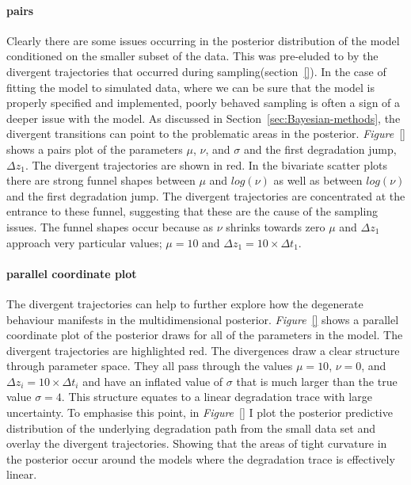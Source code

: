 \paragraph*{pairs}
Clearly there are some issues occurring in the posterior distribution of the model conditioned on the smaller subset of the data. This was pre-eluded to by the divergent trajectories that occurred during sampling(section~\ref{}). In the case of fitting the model to simulated data, where we can be sure that the model is properly specified and implemented, poorly behaved sampling is often a sign of a deeper issue with the model. As discussed in Section~\ref{sec:Bayesian-methods}, the divergent transitions can point to the problematic areas in the posterior. \textit{Figure}~\ref{} shows a pairs plot of the parameters $\mu$, $\nu$, and $\sigma$ and the first degradation jump, $\Delta z_1$. The divergent trajectories are shown in red. In the bivariate scatter plots there are strong funnel shapes between $\mu$ and $log(\nu)$ as well as between $log(\nu)$ and the first degradation jump. The divergent trajectories are concentrated at the entrance to these funnel, suggesting that these are the cause of the sampling issues. The funnel shapes occur because as $\nu$ shrinks towards zero $\mu$ and $\Delta z_1$ approach very particular values; $\mu = 10$ and $\Delta z_1 = 10 \times \Delta t_1$.

\paragraph*{parallel coordinate plot}
The divergent trajectories can help to further explore how the degenerate behaviour manifests in the multidimensional posterior. \textit{Figure}~\ref{} shows a parallel coordinate plot of the posterior draws for all of the parameters in the model. The divergent trajectories are highlighted red. The divergences draw a clear structure through parameter space. They all pass through the values $\mu = 10$, $\nu = 0$, and $\Delta z_i = 10 \times \Delta t_i$ and have an inflated value of $\sigma$ that is much larger than the true value $\sigma = 4$. This structure equates to a linear degradation trace with large uncertainty. To emphasise this point, in \textit{Figure}~\ref{} I plot the posterior predictive distribution of the underlying degradation path from the small data set and overlay the divergent trajectories. Showing that the areas of tight curvature in the posterior occur around the models where the degradation trace is effectively linear. 

